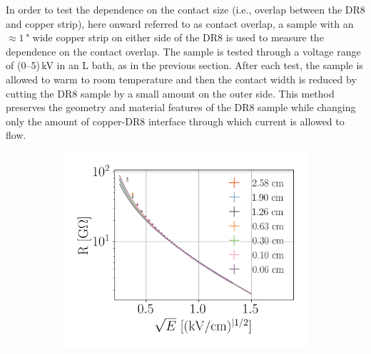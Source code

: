 \documentclass[a4paper,12pt]{article}
\newcommand{\DR}{DR8}
\begin{document}
In order to test the dependence on the contact size (i.e., overlap between the {\DR} and copper strip), here onward referred to as contact overlap, a  sample with an $\approx 1$\," wide copper strip on either side of the {\DR} is used to measure the dependence on the contact overlap.  The sample is tested through a voltage range of (0--5)\,kV in an L bath, as in the previous section.  After each test, the sample is allowed to warm to room temperature and then the contact width is reduced by cutting the {\DR} sample by a small amount on the outer side.  This method preserves the geometry and material features of the {\DR} sample while changing only the amount of copper-{\DR} interface through which current is allowed to flow.


\begin{figure}[htb]
\centering
\begin{subfigure}[c]{0.32\textheight}
	\begin{center}
		\includegraphics[width=\textwidth]{TLM_contact_resistance.png}
		

\end{center}
\end{subfigure}
\end{figure}
\end{document}
